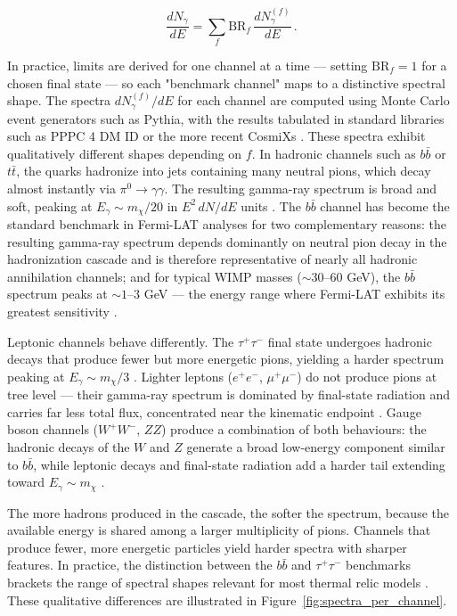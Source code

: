\begin{equation}
	\frac{dN_\gamma}{dE} = \sum_f \text{BR}_f \, \frac{dN_\gamma^{(f)}}{dE} \,.
	\label{eq:spectrum_sum}
\end{equation}

In practice, limits are derived for one channel at a time --- setting $\text{BR}_f = 1$ for a chosen final state --- so each "benchmark channel" maps to a distinctive spectral shape.
The spectra $dN_\gamma^{(f)}/dE$ for each channel are computed using Monte Carlo event generators such as Pythia, with the results tabulated in standard libraries such as PPPC 4 DM ID \cite{Cirelli:2010xx} or the more recent CosmiXs \cite{Arina:2025ner}.
These spectra exhibit qualitatively different shapes depending on $f$.
In hadronic channels such as $b\bar{b}$ or $t\bar{t}$, the quarks hadronize into jets containing many neutral pions, which decay almost instantly via $\pi^0 \to \gamma\gamma$.
The resulting gamma-ray spectrum is broad and soft, peaking at $E_\gamma \sim m_\chi / 20$ in $E^2 \, dN/dE$ units \cite{Hooper:2024,Cirelli:2024ssz}.
The $b\bar{b}$ channel has become the standard benchmark in Fermi-LAT analyses for two complementary reasons: the resulting gamma-ray spectrum depends dominantly on neutral pion decay in the hadronization cascade and is therefore representative of nearly all hadronic annihilation channels; and for typical WIMP masses ($\sim 30$--$60$ GeV), the $b\bar{b}$ spectrum peaks at $\sim 1$--$3$ GeV --- the energy range where Fermi-LAT exhibits its greatest sensitivity \cite{Hooper:2024}.

Leptonic channels behave differently.
The $\tau^+\tau^-$ final state undergoes hadronic decays that produce fewer but more energetic pions, yielding a harder spectrum peaking at $E_\gamma \sim m_\chi / 3$ \cite{Hooper:2024}.
Lighter leptons ($e^+e^-$, $\mu^+\mu^-$) do not produce pions at tree level --- their gamma-ray spectrum is dominated by final-state radiation and carries far less total flux, concentrated near the kinematic endpoint \cite{Cirelli:2024ssz}.
Gauge boson channels ($W^+W^-$, $ZZ$) produce a combination of both behaviours: the hadronic decays of the $W$ and $Z$ generate a broad low-energy component similar to $b\bar{b}$, while leptonic decays and final-state radiation add a harder tail extending toward $E_\gamma \sim m_\chi$ \cite{Cirelli:2024ssz,Hooper:2024}.

The more hadrons produced in the cascade, the softer the spectrum, because the available energy is shared among a larger multiplicity of pions.
Channels that produce fewer, more energetic particles yield harder spectra with sharper features.
In practice, the distinction between the $b\bar{b}$ and $\tau^+\tau^-$ benchmarks brackets the range of spectral shapes relevant for most thermal relic models \cite{Hooper:2024}.
These qualitative differences are illustrated in Figure~\ref{fig:spectra_per_channel}.

